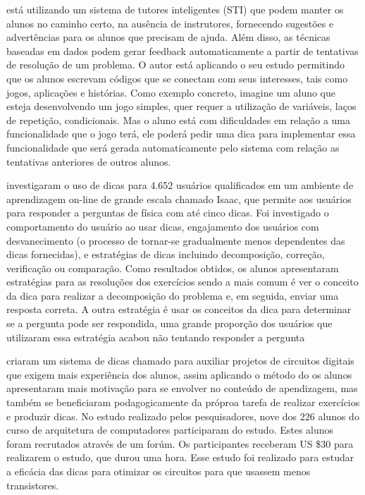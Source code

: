  está utilizando um sistema de tutores inteligentes (STI) que podem manter os alunos no caminho certo, na ausência de instrutores, fornecendo sugestões e advertências para os alunos que precisam de ajuda. Além disso, as técnicas baseadas em dados podem gerar feedback automaticamente a partir de tentativas de resolução de um problema. O autor está aplicando o seu estudo permitindo que os alunos escrevam códigos que se conectam com seus interesses, tais como jogos, aplicações e histórias. Como exemplo concreto, imagine um aluno que esteja desenvolvendo um jogo simples, quer requer a utilização de variáveis, laços de repetição, condicionais. Mas o aluno está com dificuldades em relação a uma funcionalidade que o jogo terá, ele poderá pedir uma dica para implementar essa funcionalidade que será gerada automaticamente pelo sistema com relação as tentativas anteriores de outros alunos.

 investigaram  o uso de dicas para 4.652 usuários qualificados em um ambiente de aprendizagem on-line de grande escala chamado Isaac, que permite aos usuários para responder a perguntas de física com até cinco dicas. Foi investigado o comportamento do usuário ao usar dicas, engajamento dos usuários com desvanecimento (o processo de tornar-se gradualmente menos dependentes das dicas fornecidas), e estratégias de dicas incluindo decomposição, correção, verificação ou comparação. Como resultados obtidos, os alunos apresentaram estratégias para as resoluções dos exercícios sendo a mais comum é ver o conceito da dica para realizar a decomposição do problema e, em seguida, enviar uma resposta correta. A outra estratégia é usar os conceitos da dica para determinar se a pergunta pode ser respondida, uma grande proporção dos usuários que utilizaram essa estratégia acabou não tentando responder a pergunta

 criaram um sistema de dicas chamado  para auxiliar projetos de circuitos digitais que exigem mais experiência dos alunos, assim aplicando o método do  os alunos apresentaram mais motivação para se envolver no conteúdo de apendizagem, mas também se beneficiaram podagogicamente da próproa tarefa de realizar exercícios e produzir dicas. No estudo realizado pelos pesquisadores, nove dos 226 alunos do curso de arquitetura de computadores participaram do estudo. Estes alunos foram recrutados através de um forúm. Os participantes receberam US \$30 para realizarem o estudo, que durou uma hora. Esse estudo foi realizado para estudar a eficácia das dicas para otimizar os circuitos para que usassem menos transistores. 

